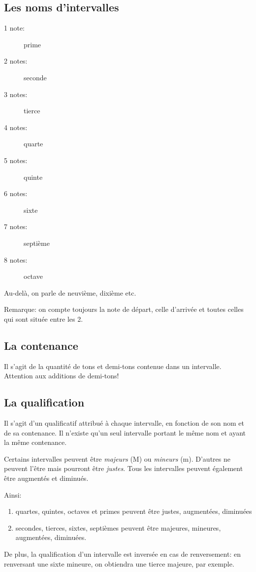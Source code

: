 \documentclass[11pt,a4paper]{scrreprt}
\begin{document}
\subsection{Les noms d'intervalles}
\begin{description}
\item [1 note:] prime
\item [2 notes:] seconde
\item [3 notes:] tierce
\item [4 notes:] quarte
\item [5 notes:] quinte
\item [6 notes:] sixte
\item [7 notes:] septième
\item [8 notes:] octave
\end{description}

Au-delà, on parle de neuvième, dixième etc.

Remarque: on compte toujours la note de départ, celle d'arrivée et toutes celles qui sont située entre les 2.
\subsection{La contenance}
Il s'agit de la quantité de tons et demi-tons contenue dans un intervalle. Attention aux additions de demi-tons!

\subsection{La qualification}
Il s'agit d'un qualificatif attribué à chaque intervalle, en fonction de son nom et de sa contenance. Il n'existe qu'un seul intervalle portant le même nom et ayant la même contenance.

Certains intervalles peuvent être \emph{majeurs} (M) ou \emph{mineurs} (m). D'autres ne peuvent l'être mais pourront être \emph{justes}. Tous les intervalles peuvent également être augmentés et diminués.

Ainsi:
\begin{enumerate}
\item quartes, quintes, octaves et primes peuvent être justes, augmentées, diminuées
\item secondes, tierces, sixtes, septièmes peuvent être majeures, mineures, augmentées, diminuées.
\end{enumerate}

De plus, la qualification d'un intervalle est inversée en cas de renversement: en renversant une sixte mineure, on obtiendra une tierce majeure, par exemple.
\end{document}
